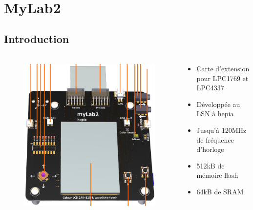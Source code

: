 \documentclass{beamer}
\begin{document}

\section{MyLab2}
\subsection{Introduction}
\begin{frame}
	\frametitle{\secname}
  \framesubtitle{\subsecname}
  \begin{columns}[T]
		\begin{column}{.30\textwidth}
			\begin{figure}
				\includegraphics[width=1\textwidth]{images/mylab2.png}
			\end{figure}
		\end{column}
		\begin{column}{.70\textwidth}
			\begin{itemize}
				\item Carte d'extension pour LPC1769 et LPC4337
				\item Développée au LSN à hepia
				\item Jusqu'à 120MHz de fréquence d'horloge
        \item 512kB de mémoire flash
        \item 64kB de SRAM
			\end{itemize}
		\end{column}
	\end{columns}
\end{frame}
\end{document}
